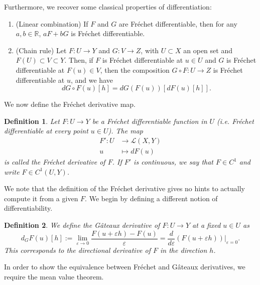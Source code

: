 \documentclass{article}
\newtheorem{definition}{Definition}
\begin{document}
Furthermore, we recover some classical properties of differentiation:
\begin{enumerate}
    \item (Linear combination) If $F$ and $G$ are Fréchet differentiable, then for any $a,b\in\mathbb{R}$, $aF+bG$ is Fréchet differentiable.
    \item (Chain rule) Let $F:U\to Y$ and $G:V\to Z$, with $U\subset X$ an open set and $F(U)\subset V\subset Y$. Then, if $F$ is Fréchet differentiable at $u\in U$ and $G$ is Fréchet differentiable at $F(u)\in V$, then the composition $G\circ F:U\to Z$ is Fréchet differentiable at $u$, and we have
        \begin{equation*}
            dG\circ F(u)[h] = dG(F(u))[dF(u)[h]].
        \end{equation*}
\end{enumerate}

We now define the Fréchet derivative map.
\begin{definition}
    Let $F:U\to Y$ be a Fréchet differentiable function in $U$ (i.e. Fréchet differentiable at every point $u\in U$). The map
    \begin{align*}
        F':U&\to \mathcal{L}(X,Y)\\
        u&\mapsto dF(u)
    \end{align*}
    is called the Fréchet derivative of $F$. If $F'$ is continuous, we say that $F\in C^1$ and write $F\in C^1(U,Y)$.
\end{definition}

We note that the definition of the Fréchet derivative gives no hints to actually compute it from a given $F$. We begin by defining a different notion of differentiability.
\begin{definition}
    We define the Gâteaux derivative of $F:U\to Y$ at a fixed $u\in U$ as
    \begin{equation*}
        d_G F(u)[h] := \lim_{\varepsilon\to 0} \frac{F(u+\varepsilon h)-F(u)}{\varepsilon} = \frac{d}{d\varepsilon}\left.\left(F(u+\varepsilon h)\right)\right|_{\varepsilon = 0}.
    \end{equation*}
    This corresponds to the directional derivative of $F$ in the direction $h$.
\end{definition}
In order to show the equivalence between Fréchet and Gâteaux derivatives, we require the mean value theorem. 
\end{document}
